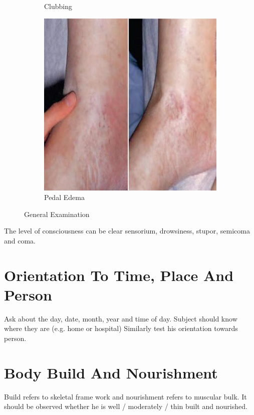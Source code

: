 \documentclass[a4paper,12pt,openany,oneside]{book}
\begin{document}
{\begin{figure}[h]
\begin{subfigure}[t]{.23\textwidth}
																	\caption{Clubbing}
																	\label{Clubbing3}
																\end{subfigure}
																\hspace{\fill}
																\begin{subfigure}[t]{.23\textwidth}
																	\centering
																	\includegraphics[width=\textwidth]{./clinicalPhysioPic/pittingPedalEdema.jpg}
																	\caption{Pedal Edema}
																	\label{PedalEdema}
																\end{subfigure}
																\caption*{General Examination}
															\end{figure}
															}
															The level of consciousness can be clear sensorium, drowsiness, stupor, semicoma and coma.
															\section*{Orientation To Time, Place And Person}
															Ask about the day, date, month, year and time of day. Subject should know where they are (e.g. home or hospital) Similarly test his orientation towards person.
															\section*{Body Build And Nourishment}
															Build refers to skeletal frame work and nourishment refers to muscular bulk. It should be observed whether he is well / moderately / thin built and nourished.
\end{document}
